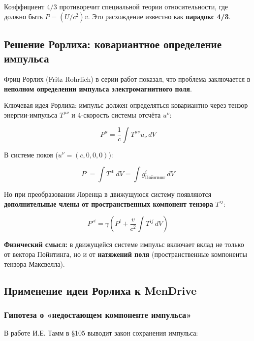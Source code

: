 \documentclass[a4paper,12pt]{article}
\begin{document}
Коэффициент $4/3$ противоречит специальной теории относительности, где должно
быть $P = (U/c^2) v$. Это расхождение известно как \textbf{парадокс 4/3}.

\subsection{Решение Рорлиха: ковариантное определение импульса}

Фриц Рорлих (Fritz Rohrlich) в серии работ \cite{Rohrlich1960, Rohrlich1966,
Rohrlich1970, Rohrlich1982, Rohrlich1997} показал, что проблема заключается
в \textbf{неполном определении импульса электромагнитного поля}.

Ключевая идея Рорлиха: импульс должен определяться ковариантно через
тензор энергии-импульса $T^{\mu\nu}$ и 4-скорость системы отсчёта $u^\nu$:

\begin{equation}
P^\mu = \frac{1}{c} \int T^{\mu\nu} u_\nu \, dV
\label{eq:rohrlich_momentum}
\end{equation}

В системе покоя ($u^\nu = (c, 0, 0, 0)$):

\begin{equation}
P^i = \int T^{i0} \, dV = \int g^i_{\text{Пойнтинг}} \, dV
\end{equation}

Но при преобразовании Лоренца в движущуюся систему появляются
\textbf{дополнительные члены от пространственных компонент тензора} $T^{ij}$:

\begin{equation}
P'^i = \gamma \left( P^i + \frac{v}{c^2} \int T^{ij} \, dV \right)
\label{eq:lorentz_transform}
\end{equation}

\textbf{Физический смысл:} в движущейся системе импульс включает вклад не
только от вектора Пойнтинга, но и от \textbf{натяжений поля} (пространственные
компоненты тензора Максвелла).

\subsection{Применение идеи Рорлиха к MenDrive}

\subsubsection{Гипотеза о «недостающем компоненте импульса»}

В работе \cite{Tamm} И.Е. Тамм в \S 105 выводит закон сохранения импульса:
\end{document}
